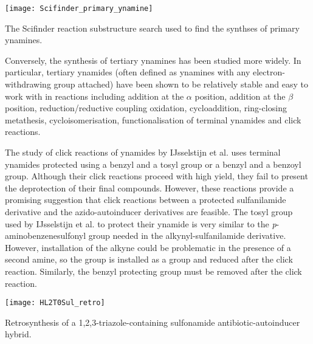 \begin{scheme}[H]
	\begin{center}
		\texttt{[image: Scifinder\_primary\_ynamine]}
		\caption{The Scifinder reaction substructure search used to find the synthses of primary ynamines\cite{ScifinderPrimaryYnamine}.
		\label{fig:Scifinder_primary_ynamine}}
	\end{center}
\end{scheme}


Conversely, the synthesis of tertiary ynamines has been studied more widely\cite{Ficini1976}. In particular, tertiary ynamides (often defined as ynamines with any electron-withdrawing group attached) have been shown to be relatively stable and easy to work with in reactions including 
addition at the $\alpha$ position, 
addition at the $\beta$ position, 
reduction/reductive coupling
oxidation,
cycloaddition, 
ring-closing metathesis,
cycloisomerisation,
functionalisation of terminal ynamides and click reactions\cite{IJsselstijn2006,Evano2010}. 

The study of click reactions of ynamides by IJsselstijn et al. uses terminal ynamides protected using a benzyl and a tosyl group or a benzyl and a benzoyl group. Although their click reactions proceed with high yield, they fail to present the deprotection of their final compounds. However, these reactions provide a promising suggestion that click reactions between a protected sulfanilamide derivative and the azido-autoinducer derivatives are feasible. The tosyl group used by IJsselstijn et al. to protect their ynamide is very similar to the \textit{p}-aminobenzenesulfonyl group needed in the alkynyl-sulfanilamide derivative. However, installation of the alkyne could be problematic in the presence of a second amine, so the  group is installed as a  group and reduced after the click reaction.  Similarly, the benzyl protecting group must be removed after the click reaction.

\begin{scheme}[H]
	\begin{center}
		\texttt{[image: HL2T0Sul\_retro]}
		\caption{Retrosynthesis of a 1,2,3-triazole-containing sulfonamide antibiotic-autoinducer hybrid.
		\label{sch:HL2T0Sul_retro}}
	\end{center}
\end{scheme}

